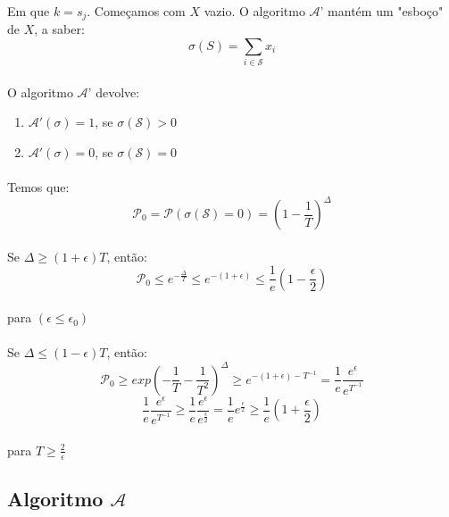 \paragraph{}Em que $k=s_j$. Começamos com $X$ vazio. O algoritmo $\mathcal{A}$' mantém um "esboço" de $X$, a saber:
$$\sigma(S) = \sum_{i \in \mathcal{S}}x_i$$
\paragraph{} O algoritmo $\mathcal{A}$' devolve:
\begin{enumerate}
    \centering
    \item $\mathcal{A}'(\sigma) = 1$, se $\sigma(\mathcal{S}) > 0$
    \item $\mathcal{A}'(\sigma) = 0$, se $\sigma(\mathcal{S}) = 0$
\end{enumerate}
\paragraph{} Temos que:
$$\mathcal{P}_0 = \mathcal{P}(\sigma(\mathcal{S})= 0) = (1-\frac{1}{T})^\Delta$$
\paragraph{} Se $\Delta \geq (1+\epsilon)T$, então:
$$\mathcal{P}_0 \leq e ^{-\frac{\Delta}{T}} \leq e ^{-(1+\epsilon)} \leq \frac{1}{e}(1-\frac{\epsilon}{2})$$
\paragraph{} para $(\epsilon \leq \epsilon_0)$
\paragraph{} Se $\Delta \leq (1-\epsilon)T$, então:
$$\mathcal{P}_0 \geq exp(-\frac{1}{T}-\frac{1}{T^2})^\Delta \geq e ^{-(1+\epsilon)-T^{-1}} = \frac{1}{e}\frac{e^\epsilon}{e^{T^{-1}}}$$
$$\frac{1}{e}\frac{e^\epsilon}{e^{T^{-1}}} \geq \frac{1}{e}\frac{e^\epsilon}{e^\frac{\epsilon}{2}}=\frac{1}{e}e^\frac{\epsilon}{2} \geq \frac{1}{e}(1+\frac{\epsilon}{2})$$
\paragraph{} para $T \geq \frac{2}{\epsilon}$

\subsection{Algoritmo $\mathcal{A}$}
